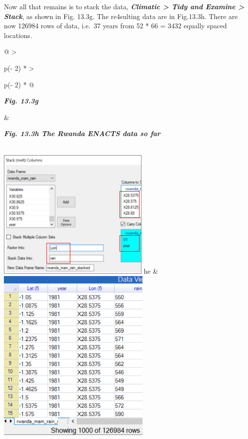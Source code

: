 \documentclass[
  letterpaper,
  DIV=11,
  numbers=noendperiod]{scrreprt}
\begin{document}
Now all that remains is to stack the data, \textbf{\emph{Climatic
\textgreater{} Tidy and Examine \textgreater{} Stack}}, as shown in Fig.
13.3g. The re4sulting data are in Fig.13.3h. There are now 126984 rows
of data, i.e.~37 years from 52 * 66 = 3432 equally spaced locations.

\begin{longtable}[]{@{}
  >{\raggedright\arraybackslash}p{(\columnwidth - 2\tabcolsep) * }
  >{\raggedright\arraybackslash}p{(\columnwidth - 2\tabcolsep) * }@{}}
\toprule\noalign{}
\begin{minipage}[b]{\linewidth}\raggedright
\textbf{\emph{Fig. 13.3g}}
\end{minipage} & \begin{minipage}[b]{\linewidth}\raggedright
\textbf{\emph{Fig. 13.3h The Rwanda ENACTS data so far}}
\end{minipage} \\
\midrule\noalign{}
\endhead
\bottomrule\noalign{}
\endlastfoot
\includegraphics[width=2.94677in,height=2.53538in]{figures/Fig13.3g.png}
he &
\includegraphics[width=2.96595in,height=\textheight]{figures/Fig13.3h.png} \\
\end{longtable}
\end{document}
